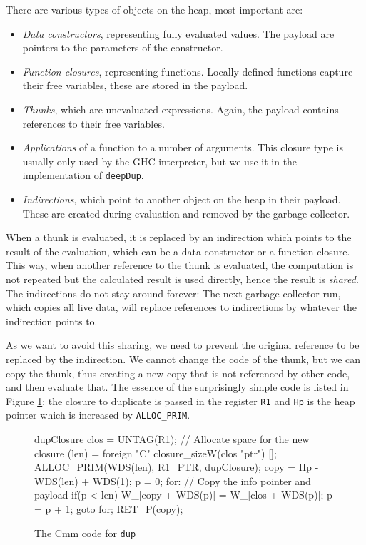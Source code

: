 \documentclass[preprint]{sigplanconf}
\theoremstyle{nonumberplain}
\newcommand{\li}{\lstinline[style=Haskell]}
\newcommand{\ci}{\lstinline[style=Cmm]}
\begin{document}
There are various types of objects on the heap, most important are:
\begin{itemize}
\item \emph{Data constructors}, representing fully evaluated values. The payload are pointers to the parameters of the constructor.
\item \emph{Function closures}, representing functions. Locally defined functions capture their free variables, these are stored in the payload.
\item \emph{Thunks}, which are unevaluated expressions. Again, the payload contains references to their free variables.
\item \emph{Applications} of a function to a number of arguments. This closure type is usually only used by the GHC interpreter, but we use it in the implementation of \li-deepDup-.
\item \emph{Indirections}, which point to another object on the heap in their payload. These are created during evaluation and removed by the garbage collector.
\end{itemize}


When a thunk is evaluated, it is replaced by an indirection which points to the result of the evaluation, which can be a data constructor or a function closure. This way, when another reference to the thunk is evaluated, the computation is not repeated but the calculated result is used directly, hence the result is \emph{shared}. The indirections do not stay around forever: The next garbage collector run, which copies all live data, will replace references to indirections by whatever the indirection points to.

As we want to avoid this sharing, we need to prevent the original reference to be replaced by the indirection. We cannot change the code of the thunk, but we can copy the thunk, thus creating a new copy that is not referenced by other code, and then evaluate that.
The essence of the surprisingly simple code is listed in Figure \ref{fig:dupcode}; the closure to duplicate is passed in the register \ci-R1- and \ci-Hp- is the heap pointer which is increased by \ci-ALLOC_PRIM-.

\begin{figure}
\begin{cmm}
dupClosure {
    clos = UNTAG(R1);
    // Allocate space for the new closure
    (len) = foreign "C" closure_sizeW(clos "ptr") [];
    ALLOC_PRIM(WDS(len), R1_PTR, dupClosure);
    copy = Hp - WDS(len) + WDS(1);
    p = 0;
    for: // Copy the info pointer and payload
    if(p < len) {
        W_[copy + WDS(p)] = W_[clos + WDS(p)];
        p = p + 1;
        goto for;
    }
    RET_P(copy);
}
\end{cmm}
\caption{The Cmm code for \li-dup-}
\label{fig:dupcode}
\end{figure}
\end{document}
